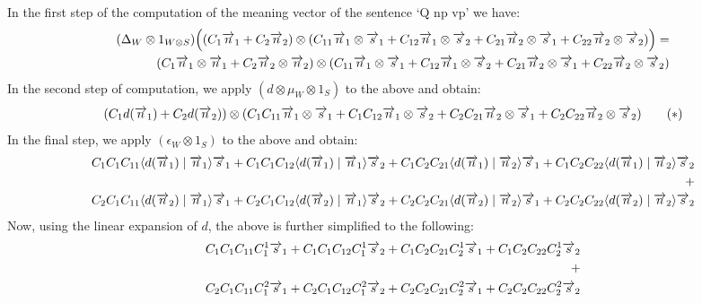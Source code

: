 In the first step of the computation of the meaning vector of the sentence `Q np vp' we have:
\begin{align*}
(\Delta_W \otimes 1_{W \otimes S})\Big((C_1\overrightarrow{n}_1 + C_2 \overrightarrow{n}_2) \otimes (C_{11} \overrightarrow{n}_1 \otimes \overrightarrow{s}_1 + C_{12} \overrightarrow{n}_1 \otimes \overrightarrow{s}_2
+ C_{21} \overrightarrow{n}_2 \otimes \overrightarrow{s}_1 + C_{22} \overrightarrow{n}_2 \otimes \overrightarrow{s}_2) \Big)=\\
(C_1 \overrightarrow{n}_1 \otimes \overrightarrow{n}_1 + C_2 \overrightarrow{n}_2 \otimes \overrightarrow{n}_2) \otimes (C_{11} \overrightarrow{n}_1 \otimes \overrightarrow{s}_1 + C_{12} \overrightarrow{n}_1 \otimes \overrightarrow{s}_2
+ C_{21} \overrightarrow{n}_2 \otimes \overrightarrow{s}_1 + C_{22} \overrightarrow{n}_2 \otimes \overrightarrow{s}_2)
\end{align*}
In the second step of computation, we apply $(d \otimes \mu_W \otimes 1_S)$ to the above and obtain:
\[
(C_1 d(\overrightarrow{n}_1) + C_2 d(\overrightarrow{n}_2)) \otimes (C_1 C_{11} \overrightarrow{n}_1 \otimes \overrightarrow{s}_1 +  C_1 C_{12} \overrightarrow{n}_1 \otimes \overrightarrow{s}_2 + C_2 C_{21} \overrightarrow{n}_2 \otimes \overrightarrow{s}_1 + C_2 C_{22} \overrightarrow{n}_2 \otimes \overrightarrow{s}_2) \qquad (*)
\]
In the final step, we apply $(\epsilon_W \otimes 1_S)$ to the above and obtain:
\begin{eqnarray*}
C_1 C_1 C_{11}  \langle d(\overrightarrow{n}_1) \mid \overrightarrow{n}_1\rangle   \overrightarrow{s}_1 +  C_1 C_1 C_{12} \langle d(\overrightarrow{n}_1) \mid \overrightarrow{n}_1 \rangle  \overrightarrow{s}_2 + C_1 C_2 C_{21} \langle d(\overrightarrow{n}_1) \mid \overrightarrow{n}_2\rangle  \overrightarrow{s}_1 + C_1 C_2 C_{22} \langle d(\overrightarrow{n}_1) \mid  \overrightarrow{n}_2 \rangle  \overrightarrow{s}_2 \\
+\\
C_2 C_1 C_{11}  \langle d(\overrightarrow{n}_2) \mid \overrightarrow{n}_1\rangle   \overrightarrow{s}_1 +  C_2 C_1 C_{12} \langle d(\overrightarrow{n}_2) \mid \overrightarrow{n}_1 \rangle  \overrightarrow{s}_2 + C_2 C_2 C_{21} \langle d(\overrightarrow{n}_2) \mid \overrightarrow{n}_2\rangle  \overrightarrow{s}_1 + C_2 C_2 C_{22} \langle d(\overrightarrow{n}_2) \mid  \overrightarrow{n}_2 \rangle  \overrightarrow{s}_2
\end{eqnarray*}
Now,  using the linear expansion of $d$, the above is further simplified   to the following:
\begin{eqnarray*}
C_1 C_1 C_{11}C_1^1 \overrightarrow{s}_1 + C_1 C_1 C_{12} C_1^1 \overrightarrow{s}_2 + C_1 C_2 C_{21} C_2^1 \overrightarrow{s}_1 + C_1 C_2 C_{22} C_2^1 \overrightarrow{s}_2\\
+\\
C_2C_1C_{11} C_1^2\overrightarrow{s}_1 + C_2C_1C_{12} C_1^2 \overrightarrow{s}_2 + C_2C_2C_{21} C_2^2 \overrightarrow{s}_1 +
C_2 C_2 C_{22} C_2^2 \overrightarrow{s}_2
\end{eqnarray*}

